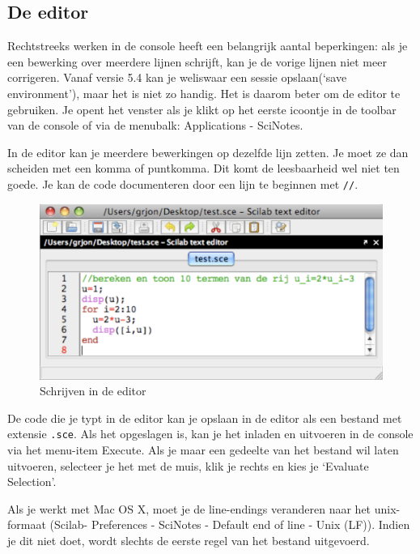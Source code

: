 \newpage
\subsection{De editor}

Rechtstreeks werken in de console heeft een belangrijk aantal beperkingen: als je een bewerking over meerdere lijnen schrijft, kan je de vorige lijnen niet meer corrigeren. Vanaf versie 5.4 kan je weliswaar een sessie  opslaan(`save environment'), maar het is niet zo handig.  Het is daarom beter om de editor te gebruiken. Je opent het venster als je klikt op het eerste icoontje in de toolbar van de console of via de menubalk: Applications - SciNotes.

In de editor kan je meerdere bewerkingen op dezelfde lijn zetten. Je moet ze dan scheiden met een komma of puntkomma. Dit komt de leesbaarheid wel niet ten goede. Je kan de code documenteren door een lijn te beginnen met \verb+//+. 

\begin{figure}[h!t]
   \begin{center}
    \includegraphics[width=\textwidth]{figuren/scilab/03editor}
  \caption{Schrijven in de editor}
	\label{fig:editor}
	\end{center}
\end{figure}

De code die je typt in de editor kan je opslaan in de editor als een bestand met extensie \verb+.sce+. Als het opgeslagen is, kan je het inladen en uitvoeren in de console via het menu-item Execute. Als je maar een gedeelte van het bestand wil laten uitvoeren, selecteer je het met de muis, klik je rechts en kies je `Evaluate Selection'.

Als je werkt met Mac OS X, moet je de line-endings veranderen naar het unix-formaat (Scilab- Preferences - SciNotes - Default end of line - Unix (LF)). Indien je dit niet doet, wordt slechts de eerste regel van het bestand uitgevoerd.

